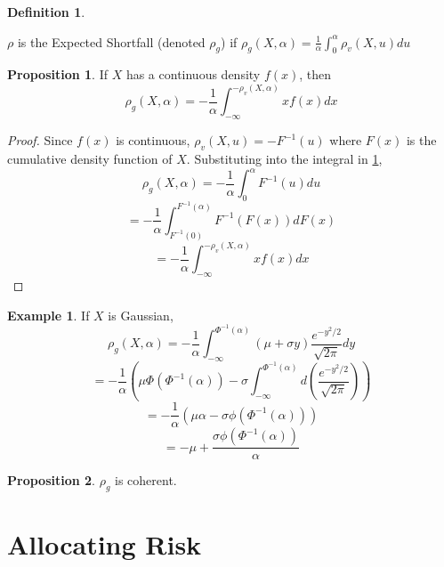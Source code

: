 \documentclass[12pt]{article}
\theoremstyle{definition}
\newtheorem{riskmeasure}{Definition}
\newtheorem{example}{Example}
\newtheorem{prop}{Proposition}
\begin{document}
\begin{riskmeasure}\label{defShortfall}

\(\rho\) is the Expected Shortfall (denoted \(\rho_g\)) if \(\rho_g (X, \alpha)=\frac{1}{\alpha}\int_0 ^ \alpha \rho_v(X, u) du\)

\end{riskmeasure}

\begin{prop}
If \(X\) has a continuous density \(f(x)\), then \[\rho_g(X, \alpha)=-\frac{1}{\alpha}\int_{-\infty} ^ {-\rho_v(X, \alpha)} x f(x) dx\]

\end{prop}

\begin{proof}
Since \(f(x)\) is continuous, \(\rho_v(X, u)=-F^{-1}(u)\) where \(F(x)\) is the cumulative density function of \(X\).  Substituting into the integral in \ref{defShortfall}, 
\[\rho_g (X, \alpha)=-\frac{1}{\alpha}\int_0 ^ \alpha F^{-1}(u) du\]
\[=-\frac{1}{\alpha}\int_{F^{-1}(0)} ^ {F^{-1}(\alpha)} F^{-1}(F(x)) dF(x)\]
\[=-\frac{1}{\alpha}\int_{-\infty} ^ {-\rho_v(X, \alpha)} x f(x) dx\]

\end{proof}

\begin{example}
If \(X\) is Gaussian,
\[\rho_g (X, \alpha)=-\frac{1}{\alpha} \int_{-\infty} ^{ \Phi ^{-1}(\alpha)} ( \mu +\sigma y) \frac{e^{-y^2 /2}}{\sqrt{2\pi}} dy\]
\[=-\frac{1}{\alpha} \left(\mu\Phi(\Phi^{-1}(\alpha))  -\sigma \int_{-\infty} ^{ \Phi ^{-1}(\alpha)} d \left(\frac{e^{-y^2 /2}}{\sqrt{2\pi}} \right) \right)\]
\[=-\frac{1}{\alpha} \left(\mu\alpha  -\sigma \phi \left(\Phi^{-1}(\alpha)\right) \right)\]
\[=-\mu+\frac{\sigma \phi \left( \Phi^{-1}(\alpha)\right)}{\alpha}\]

\end{example}

\begin{prop}
\(\rho_g\) is coherent.\cite{tasche2001}
\end{prop}

\section{Allocating Risk}
\end{document}
